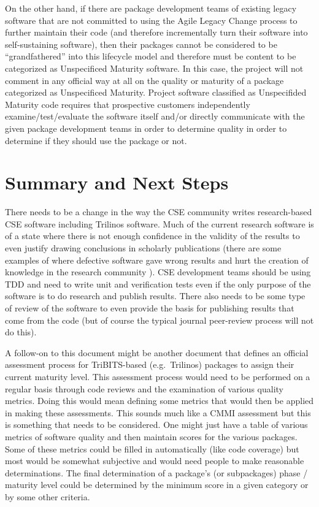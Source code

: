 \documentclass[11pt]{SANDreport}
\begin{document}
On the other hand, if there are package development teams of existing
legacy software that are not committed to using the Agile Legacy
Change process to further maintain their code (and therefore
incrementally turn their software into self-sustaining software), then
their packages cannot be considered to be ``grandfathered'' into this
lifecycle model and therefore must be content to be categorized as
Unspecificed Maturity software.  In this case, the project will not
comment in any official way at all on the quality or maturity of a
package categorized as Unspecificed Maturity.  Project software
classified as Unspecifided Maturity code requires that prospective
customers independently examine/test/evaluate the software itself
and/or directly communicate with the given package development teams
in order to determine quality in order to determine if they should use
the package or not.


%
{}\section{Summary and Next Steps}
\label{sec:summary_next_steps}
%

There needs to be a change in the way the CSE community writes
research-based CSE software including Trilinos software.  Much of the
current research software is of a state where there is not enough
confidence in the validity of the results to even justify drawing
conclusions in scholarly publications (there are some examples of
where defective software gave wrong results and hurt the creation of
knowledge in the research community
{}\cite{ScientistsNightmareFiveRetractions2006}).  CSE development
teams should be using TDD and need to write unit and verification
tests even if the only purpose of the software is to do research and
publish results.  There also needs to be some type of review of the
software to even provide the basis for publishing results that come
from the code (but of course the typical journal peer-review process
will not do this).

A follow-on to this document might be another document that defines an
official assessment process for TriBITS-based (e.g.\ Trilinos)
packages to assign their current maturity level.  This assessment
process would need to be performed on a regular basis through code
reviews and the examination of various quality metrics.  Doing this
would mean defining some metrics that would then be applied in making
these assessments. This sounds much like a CMMI assessment but this is
something that needs to be considered.  One might just have a table of
various metrics of software quality and then maintain scores for the
various packages.  Some of these metrics could be filled in
automatically (like code coverage) but most would be somewhat
subjective and would need people to make reasonable determinations.
The final determination of a package's (or subpackages) phase /
maturity level could be determined by the minimum score in a given
category or by some other criteria.
\end{document}
